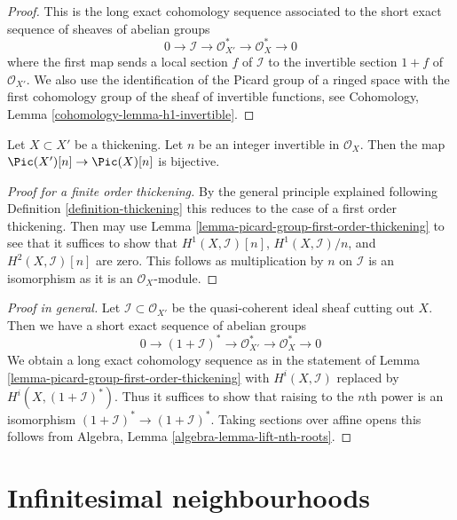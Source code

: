 \begin{proof}
This is the long exact cohomology sequence associated to the
short exact sequence of sheaves of abelian groups
$$
0 \to \mathcal{I} \to \mathcal{O}_{X'}^* \to \mathcal{O}_X^* \to 0
$$
where the first map sends a local section $f$ of $\mathcal{I}$
to the invertible section $1 + f$ of $\mathcal{O}_{X'}$.
We also use the identification of the Picard group of a
ringed space with the first cohomology group of the sheaf
of invertible functions, see
Cohomology, Lemma \ref{cohomology-lemma-h1-invertible}.
\end{proof}

\begin{lemma}
\label{lemma-torsion-pic-thickening}
Let $X \subset X'$ be a thickening. Let $n$ be an integer
invertible in $\mathcal{O}_X$. Then the map
$\Pic(X')[n] \to \Pic(X)[n]$ is bijective.
\end{lemma}

\begin{proof}[Proof for a finite order thickening]
By the general principle explained following
Definition \ref{definition-thickening}
this reduces to the case of a first order thickening.
Then may use Lemma \ref{lemma-picard-group-first-order-thickening}
to see that it suffices to show that
$H^1(X, \mathcal{I})[n]$, $H^1(X, \mathcal{I})/n$, and
$H^2(X, \mathcal{I})[n]$ are zero.
This follows as multiplication by $n$ on $\mathcal{I}$
is an isomorphism as it is an $\mathcal{O}_X$-module.
\end{proof}

\begin{proof}[Proof in general]
Let $\mathcal{I} \subset \mathcal{O}_{X'}$ be the quasi-coherent ideal
sheaf cutting out $X$. Then we have a short exact sequence of
abelian groups
$$
0 \to (1 + \mathcal{I})^* \to \mathcal{O}_{X'}^* \to \mathcal{O}_X^* \to 0
$$
We obtain a long exact cohomology sequence as in the statement of
Lemma \ref{lemma-picard-group-first-order-thickening}
with $H^i(X, \mathcal{I})$ replaced by $H^i(X, (1 + \mathcal{I})^*)$.
Thus it suffices to show that raising to the $n$th power is an
isomorphism $(1 + \mathcal{I})^* \to (1 + \mathcal{I})^*$.
Taking sections over affine opens this follows from
Algebra, Lemma \ref{algebra-lemma-lift-nth-roots}.
\end{proof}





\section{Infinitesimal neighbourhoods}
\label{section-first-order-infinitesimal-neighbourhood}

